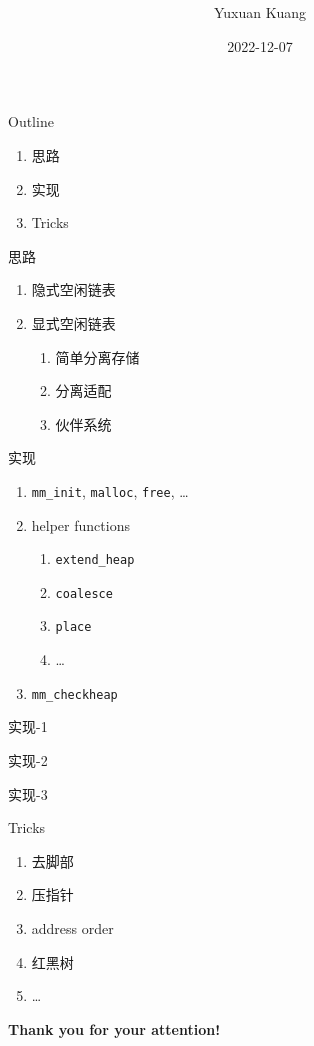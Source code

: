 \documentclass{beamer}
\title{\textbf{\topic}}
\author{Yuxuan Kuang}
\institute{School of EECS, PKU}
\date{2022-12-07}
\begin{document}
{ 
\frame{\titlepage}}

\begin{frame}{Outline}
\begin{enumerate}
	\item 思路
	\item 实现
	\item Tricks
\end{enumerate}
\end{frame}

\begin{frame}{思路}
\begin{enumerate}
	\item 隐式空闲链表
	\item 显式空闲链表
		\begin{enumerate}
			\item 简单分离存储
			\item 分离适配
			\item 伙伴系统
		\end{enumerate}
\end{enumerate}
\end{frame}

\begin{frame}{实现}
\begin{enumerate}
	\item \texttt{mm\_init}, \texttt{malloc}, \texttt{free}, \dots
	\item helper functions
		\begin{enumerate}
			\item \texttt{extend\_heap}
			\item \texttt{coalesce}
			\item \texttt{place}
			\item \dots
		\end{enumerate}
	\item \texttt{mm\_checkheap}
\end{enumerate}
\end{frame}

\begin{frame}{实现-1}
	
\end{frame}

\begin{frame}{实现-2}

\end{frame}

\begin{frame}{实现-3}
	
\end{frame}

\begin{frame}{Tricks}
	\begin{enumerate}
		\item 去脚部
		\item 压指针
		\item address order
		\item 红黑树
		\item \dots
	\end{enumerate}
\end{frame}
  
\begin{frame}{}
\begin{center}
	\textbf{Thank you for your attention!}
\end{center}
\end{frame}
\end{document}
